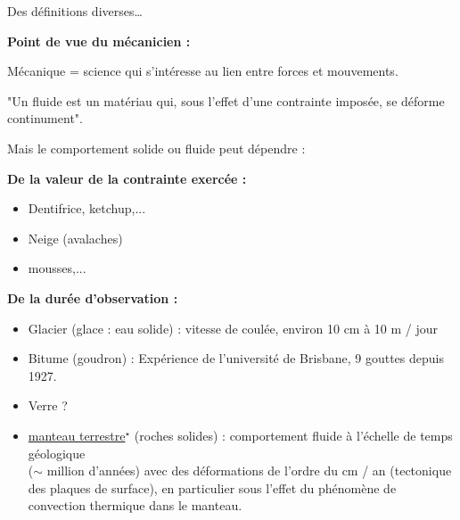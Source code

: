 \begin{frame}{Des définitions diverses\ldots} 

\small

\textbf{Point de vue du mécanicien :} \bigskip

Mécanique = science qui s'intéresse au lien entre forces et mouvements.

"Un fluide est un matériau qui, sous l'effet d'une contrainte imposée, se déforme continument".

Mais le comportement solide ou fluide peut dépendre :

\medskip

\pause


\textbf{De la valeur de la contrainte exercée :}

\begin{itemize}[<+-| alert@+>]

\item Dentifrice, ketchup,...

\item Neige (avalaches)

\item mousses,...

\end{itemize}

\medskip 

\pause

\textbf{De la durée d'observation :}

\begin{itemize}[<+-| alert@+>]
\item 
	Glacier (glace : eau solide) : 
	vitesse de coulée, %
	environ 10 cm à 10 m / jour

\item
	Bitume (goudron) :
	Expérience de l'université de Brisbane, 9 gouttes depuis 1927.
	
\item Verre ?

\item 

	\hyperlink{frame:manteau_terrestre}{manteau terrestre$^\star$}
	(roches solides) : comportement fluide à l'échelle de temps géologique 
	\\ ($\sim$ million d'années) avec des déformations de l'ordre du cm / an 
	(tectonique des plaques de surface), en particulier 
	sous l'effet du phénomène de convection thermique dans le manteau.


\end{itemize}
\end{frame}
